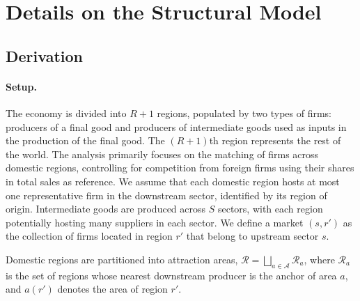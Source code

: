 %
%
%

\section{Details on the Structural Model}
\label{app:model}

\subsection{Derivation}
\label{app:model-derivation}

\paragraph{Setup.} The economy is divided into $R+1$ regions, populated by two types of firms:
producers of a final good and producers of intermediate goods used as inputs in the production
of the final good. The $(R+1)$th region represents the rest of the world. The analysis primarily
focuses on the matching of firms across domestic regions, controlling for competition from
foreign firms using their shares in total sales as reference. We assume that each domestic
region hosts at most one representative firm in the downstream sector, identified by its region
of origin. Intermediate goods are produced across $S$ sectors, with each region potentially
hosting many suppliers in each sector. We define a market $(s,r')$ as the collection of firms
located in region $r'$ that belong to upstream sector $s$.

Domestic regions are partitioned into attraction areas,
$\mathcal{R}=\bigsqcup_{a\in\mathcal{A}}\mathcal{R}_{a}$, where $\mathcal{R}_{a}$ is the set of
regions whose nearest downstream producer is the anchor of area $a$, and $a(r')$ denotes the
area of region $r'$.

